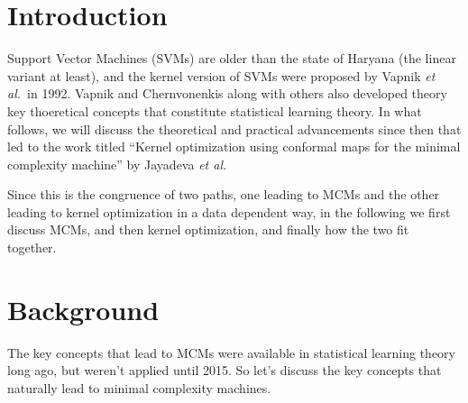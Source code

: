 \documentclass[11pt]{article}
\newcommand{\etal}{{\em et al.}}
\begin{document}


\section{Introduction}
Support Vector Machines (SVMs) are older than the state of Haryana (the linear variant at
least), and the kernel version of SVMs were proposed by Vapnik \etal\ in 1992. Vapnik and
Chernvonenkis along with others also developed theory key thoeretical concepts that
constitute statistical learning theory. In what follows, we will discuss the theoretical
and practical advancements since then that led to the work titled ``Kernel optimization
using conformal maps for the minimal complexity machine'' by Jayadeva \etal\par
Since this is the congruence of two paths, one leading to MCMs and the other leading to
kernel optimization in a data dependent way, in the following we first discuss MCMs, and
then kernel optimization, and finally how the two fit together.


\section{Background}
The key concepts that lead to MCMs were available in statistical learning theory long ago,
but weren't applied until 2015. So let's discuss the key concepts that naturally lead to
minimal complexity machines.
\end{document}
